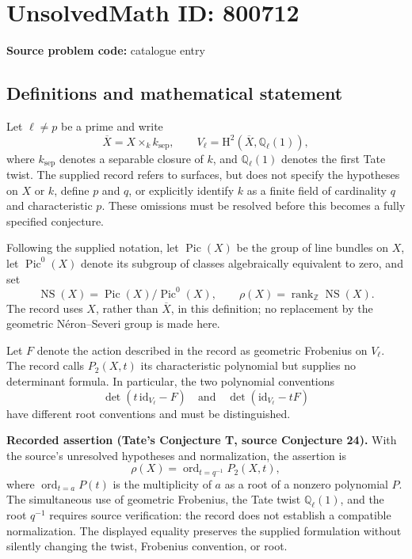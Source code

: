 \documentclass[11pt]{article}
\newcommand{\Z}{\mathbb{Z}}
\newcommand{\Q}{\mathbb{Q}}
\begin{document}
\section*{UnsolvedMath ID: 800712}
\textbf{Source problem code:} catalogue entry
\subsection{Definitions and mathematical statement}
Let \(\ell\neq p\) be a prime and write
\[
\overline X=X\times_k k_{\mathrm{sep}},\qquad
V_\ell=\mathrm H^2(\overline X,\Q_\ell(1)),
\]
where \(k_{\mathrm{sep}}\) denotes a separable closure of \(k\), and \(\Q_\ell(1)\) denotes the first Tate twist. The supplied record refers to surfaces, but does not specify the hypotheses on \(X\) or \(k\), define \(p\) and \(q\), or explicitly identify \(k\) as a finite field of cardinality \(q\) and characteristic \(p\). These omissions must be resolved before this becomes a fully specified conjecture.

Following the supplied notation, let \(\operatorname{Pic}(X)\) be the group of line bundles on \(X\), let \(\operatorname{Pic}^0(X)\) denote its subgroup of classes algebraically equivalent to zero, and set
\[
\operatorname{NS}(X)=\operatorname{Pic}(X)/\operatorname{Pic}^0(X),\qquad
\rho(X)=\operatorname{rank}_{\Z}\operatorname{NS}(X).
\]
The record uses \(X\), rather than \(\overline X\), in this definition; no replacement by the geometric N\'eron--Severi group is made here.

Let \(F\) denote the action described in the record as geometric Frobenius on \(V_\ell\). The record calls \(P_2(X,t)\) its characteristic polynomial but supplies no determinant formula. In particular, the two polynomial conventions
\[
\det(t\,\mathrm{id}_{V_\ell}-F)
\quad\text{and}\quad
\det(\mathrm{id}_{V_\ell}-tF)
\]
have different root conventions and must be distinguished.

\textbf{Recorded assertion (Tate's Conjecture T, source Conjecture 24).} With the source's unresolved hypotheses and normalization, the assertion is
\[
\rho(X)=\operatorname{ord}_{t=q^{-1}}P_2(X,t),
\]
where \(\operatorname{ord}_{t=a}P(t)\) is the multiplicity of \(a\) as a root of a nonzero polynomial \(P\). The simultaneous use of geometric Frobenius, the Tate twist \(\Q_\ell(1)\), and the root \(q^{-1}\) requires source verification: the record does not establish a compatible normalization. The displayed equality preserves the supplied formulation without silently changing the twist, Frobenius convention, or root.
\end{document}
